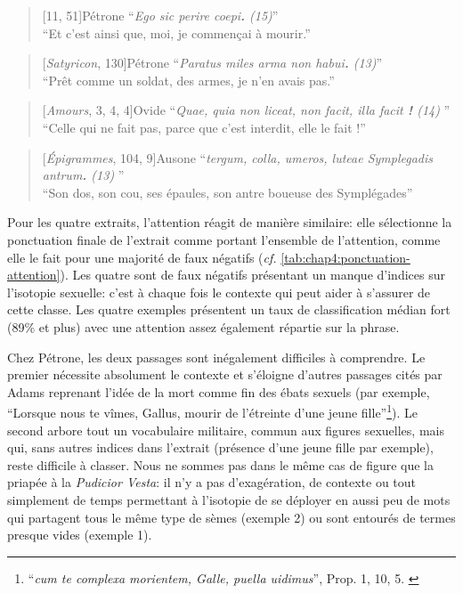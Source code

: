\starbreak

\begin{quote}[11, 51]{Pétrone}
    \enquote{\textit{Ego sic perire coepi\textbf{.} (15)}}\\
    \enquote{Et c'est ainsi que, moi, je commençai à mourir.}
\end{quote}

\begin{quote}[\textit{Satyricon}, 130]{Pétrone}
    \enquote{\textit{Paratus miles arma non habui\textbf{.} (13)}} \\
    \enquote{Prêt comme un soldat, des armes, je n'en avais pas.}
\end{quote}

\begin{quote}[\textit{Amours}, 3, 4, 4]{Ovide}
    \enquote{\textit{Quae, quia non liceat, non facit, illa facit \textbf{!} (14) }}\\
    \enquote{Celle qui ne fait pas, parce que c'est interdit, elle le fait !}
\end{quote}

\begin{quote}[\textit{Épigrammes}, 104, 9]{Ausone}
    \enquote{\textit{tergum, colla, umeros, luteae Symplegadis antrum\textbf{.} (13) }} \\
    \enquote{Son dos, son cou, ses épaules, son antre boueuse des Symplégades}
\end{quote}

Pour les quatre extraits, l'attention réagit de manière similaire: elle sélectionne la ponctuation finale de l'extrait comme portant l'ensemble de l'attention, comme elle le fait pour une majorité de faux négatifs (\textit{cf.} \ref{tab:chap4:ponctuation-attention}). Les quatre sont de faux négatifs présentant un manque d'indices sur l'isotopie sexuelle: c'est à chaque fois le contexte qui peut aider à s'assurer de cette classe. Les quatre exemples présentent un taux de classification médian fort (89\% et plus) avec une attention assez également répartie sur la phrase.

Chez Pétrone, les deux passages sont inégalement difficiles à comprendre. Le premier nécessite absolument le contexte et s'éloigne d'autres passages cités par Adams reprenant l'idée de la mort comme fin des ébats sexuels (par exemple, \enquote{Lorsque nous te vîmes, Gallus, mourir de l'étreinte d'une jeune fille}\footnote{\enquote{\textit{cum te complexa morientem, Galle, puella uidimus}}, Prop. 1, 10, 5. \textcite[p.159]{adams}}). Le second arbore tout un vocabulaire militaire, commun aux figures sexuelles, mais qui, sans autres indices dans l'extrait (présence d'une jeune fille par exemple), reste difficile à classer. Nous ne sommes pas dans le même cas de figure que la priapée à la \textit{Pudicior Vesta}: il n'y a pas d'exagération, de contexte ou tout simplement de temps permettant à l'isotopie de se déployer en aussi peu de mots qui partagent tous le même type de sèmes (exemple 2) ou sont entourés de termes presque vides (exemple 1).

